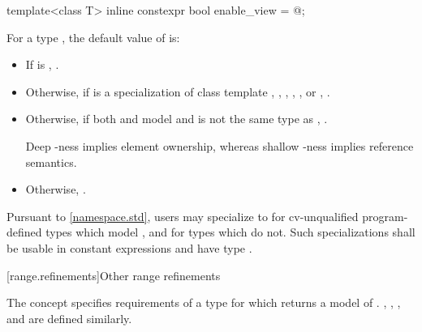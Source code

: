 %
\begin{itemdecl}
template<class T>
  inline constexpr bool enable_view = @\seebelow@;
\end{itemdecl}

\begin{itemdescr}
\pnum
\remarks
For a type , the default value of  is:
\begin{itemize}

\item If  is , .
\item Otherwise, if  is a specialization of class template
  ,
  ,
  ,
  ,
  , or
  , .
\item Otherwise, if both  and  model 
  and  is not the same type as
  ,
  .
  \begin{note}
  Deep -ness implies element ownership,
  whereas shallow -ness implies reference semantics.
  \end{note}
\item Otherwise, .
\end{itemize}

\pnum
Pursuant to \ref{namespace.std}, users may specialize 
to 
for cv-unqualified program-defined types which model ,
and  for types which do not.
Such specializations shall
be usable in constant expressions and
have type .
\end{itemdescr}

[range.refinements]{Other range refinements}

\pnum
The  concept specifies requirements of a
 type for which  returns
a model of .
, , ,
and  are defined similarly.

